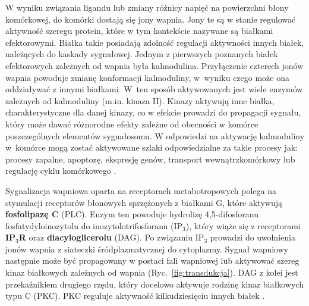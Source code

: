 W wyniku związania ligandu lub zmiany różnicy napięć na powierzchni błony komórkowej, do komórki dostają się jony wapnia. Jony te są w stanie regulować aktywność szeregu protein, które w tym kontekście nazywane są białkami efektorowymi. Białka takie posiadają zdolność regulacji aktywności innych białek, należących do kaskady sygnałowej. Jednym z pierwszych poznanych białek efektorowych zależnych od wapnia była kalmodulina. Przyłączenie czterech jonów wapnia powoduje zmianę konformacji kalmoduliny, w~wyniku czego może ona oddziaływać z innymi białkami. W~ten sposób aktywowanych jest wiele enzymów zależnych od kalmoduliny (m.in. kinaza II). Kinazy aktywują inne białka, charakterystyczne dla danej kinazy, co w efekcie prowadzi do propagacji sygnału, który może dawać różnorodne efekty zależne od obecności w komórce poszczególnych elementów sygnałosomu. W odpowiedzi na aktywację kalmoduliny w~komórce mogą zostać aktywowane szlaki odpowiedzialne za takie procesy jak: procesy zapalne, apoptozę, ekspresję genów, transport wewnątrzkomórkowy lub regulację cyklu komórkowego \cite{Berridge2012i}.

Sygnalizacja wapniowa oparta na receptorach metabotropowych polega na stymulacji receptorów błonowych sprzężonych z białkami G, które aktywują \textbf{fosfolipazę C} (PLC). Enzym ten powoduje hydrolizę 4,5-difosforanu fosfatydyloinozytolu do inozytolotrifosforanu (IP$_3$), który wiąże się z receptorami \textbf{IP$_3$R} oraz \textbf{diacyloglicerolu} (DAG). Po związaniu IP$_3$ prowadzi do uwolnienia jonów wapnia z siateczki śródplazmatycznej do cytoplazmy. Sygnał wapniowy następnie może być propagowany w postaci fali wapniowej lub aktywować szereg kinaz białkowych zależnych od wapnia (Ryc.~\ref{fig:transdukcja}). DAG z kolei jest przekaźnikiem drugiego rzędu, który docelowo aktywuje rodzinę kinaz białkowych typu C (PKC). PKC reguluje aktywność kilkudziesięciu innych białek \cite{Newton1995}.

